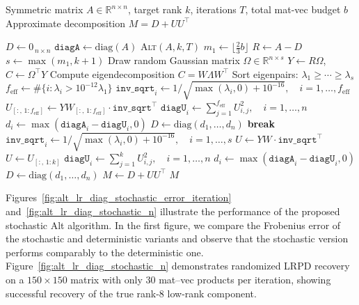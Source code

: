 \documentclass[final,hidelinks,onefignum,onetabnum]{siamart250211}
\providecommand{\diag}{\mathrm{diag}}
\providecommand{\1}{\mathbf{1}}
\theoremstyle{plain}
\begin{document}
\begin{algorithm}
\caption{Stochastic Alternating Low‐Rank then Diagonal (Stochastic Alt)}
\label{alg:stoch_alt_lr_diag}
\begin{algorithmic}[1]
\REQUIRE Symmetric matrix $A\in\mathbb{R}^{n\times n}$, target rank $k$, iterations $T$, total mat-vec budget $b$
\ENSURE Approximate decomposition $M = D + U U^\top$

\STATE $D \gets 0_{\,n\times n}$ 
\STATE $\texttt{diagA} \gets \diag(A)$
  \RETURN \textsc{Alt}$(A, k, T)$
\ENDIF
\STATE $m_1 \gets \lfloor \tfrac{2}{3}b \rfloor$
  \STATE $R \gets A - D$
  \STATE $s \gets \max(m_1, k + 1)$
  \STATE Draw random Gaussian matrix $\Omega \in \mathbb{R}^{n \times s}$
  \STATE $Y \gets R \Omega$, \quad $C \gets \Omega^\top Y$
  \STATE Compute eigendecomposition $C = W \Lambda W^\top$
  \STATE Sort eigenpairs: $\lambda_1 \ge \cdots \ge \lambda_s$
    \STATE $f_{\text{eff}} \gets \#\{i : \lambda_i > 10^{-12} \lambda_1\}$
    \STATE $\texttt{inv\_sqrt}_i \gets 1/\sqrt{\max(\lambda_i,0) + 10^{-16}},\quad i=1,\dots,f_{\text{eff}}$
    \STATE $U_{[:,\,1:f_{\text{eff}}]} \gets Y W_{[:,\,1:f_{\text{eff}}]} \cdot \texttt{inv\_sqrt}^\top$
    \STATE $\texttt{diagU}_i \gets \sum_{j=1}^{f_{\text{eff}}} U_{i,j}^2,\quad i=1,\dots,n$
    \STATE $d_i \gets \max(\texttt{diagA}_i - \texttt{diagU}_i, 0)$
    \STATE $D \gets \diag(d_1,\dots,d_n)$
    \STATE \textbf{break}
  \ENDIF
  \STATE $\texttt{inv\_sqrt}_i \gets 1/\sqrt{\max(\lambda_i,0) + 10^{-16}},\quad i=1,\dots,s$
  \STATE $U \gets Y W \cdot \texttt{inv\_sqrt}^\top$
  \STATE $U \gets U_{[:,\,1:k]}$
  \STATE $\texttt{diagU}_i \gets \sum_{j=1}^{k} U_{i,j}^2,\quad i=1,\dots,n$
  \STATE $d_i \gets \max(\texttt{diagA}_i - \texttt{diagU}_i, 0)$
  \STATE $D \gets \diag(d_1,\dots,d_n)$
\ENDFOR
\STATE $M \gets D + UU^\top$
\RETURN $M$
\end{algorithmic}
\end{algorithm}


Figures~\ref{fig:alt_lr_diag_stochastic_error_iteration} and~\ref{fig:alt_lr_diag_stochastic_n} illustrate the performance of the proposed stochastic Alt algorithm. In the first figure, we compare the Frobenius error of the stochastic and deterministic variants and observe that the stochastic version performs comparably to the deterministic one. Figure~\ref{fig:alt_lr_diag_stochastic_n} demonstrates randomized LRPD recovery on a $150\times150$ matrix with only 30 mat–vec products per iteration, showing successful recovery of the true rank-8 low-rank component.  
\end{document}
